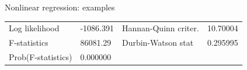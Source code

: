\documentclass{beamer}
\begin{document}
\begin{frame}{Nonlinear regression: examples}
\begin{table}[]
\begin{tabular}{@{}lllll@{}}
Log likelihood                                               & -1086.391                                            & \multicolumn{2}{l}{Hannan-Quinn criter.}                                                                             & 10.70004                                           \\
F-statistics                                                 & 86081.29                                             & \multicolumn{2}{l}{Durbin-Watson stat}                                                                               & 0.295995                                           \\
Prob(F-statistics)                                           & 0.000000                                             & \multicolumn{2}{l}{}                                                                                                 &                                                    \\ \bottomrule
\end{tabular}
\end{table}
\end{frame}
\end{document}
